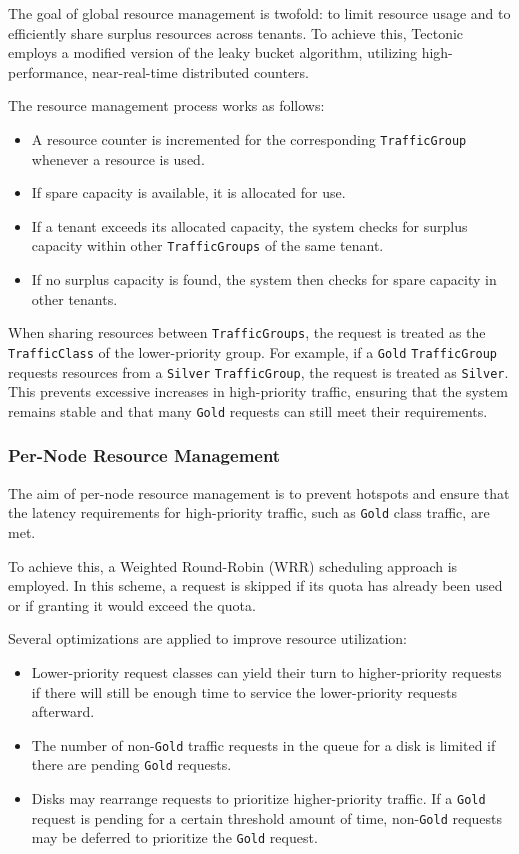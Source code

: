 The goal of global resource management is twofold: to limit resource usage and to efficiently share surplus resources across tenants. To achieve this, Tectonic employs a modified version of the leaky bucket algorithm, utilizing high-performance, near-real-time distributed counters.

The resource management process works as follows:

\begin{itemize}\label{list:resource_management}
    \item A resource counter is incremented for the corresponding \texttt{TrafficGroup} whenever a resource is used.
    \item If spare capacity is available, it is allocated for use.
    \item If a tenant exceeds its allocated capacity, the system checks for surplus capacity within other \texttt{TrafficGroups} of the same tenant.
    \item If no surplus capacity is found, the system then checks for spare capacity in other tenants.
\end{itemize}

When sharing resources between \texttt{TrafficGroups}, the request is treated as the \texttt{TrafficClass} of the lower-priority group. For example, if a \texttt{Gold} \texttt{TrafficGroup} requests resources from a \texttt{Silver} \texttt{TrafficGroup}, the request is treated as \texttt{Silver}. This prevents excessive increases in high-priority traffic, ensuring that the system remains stable and that many \texttt{Gold} requests can still meet their requirements.

\subsubsection{Per-Node Resource Management}\label{sec:per_node_resource_management}

The aim of per-node resource management is to prevent hotspots and ensure that the latency requirements for high-priority traffic, such as \texttt{Gold} class traffic, are met.

To achieve this, a Weighted Round-Robin (WRR) scheduling approach is employed. In this scheme, a request is skipped if its quota has already been used or if granting it would exceed the quota.

Several optimizations are applied to improve resource utilization:

\begin{itemize}
    \item Lower-priority request classes can yield their turn to higher-priority requests if there will still be enough time to service the lower-priority requests afterward.
    \item The number of non-\texttt{Gold} traffic requests in the queue for a disk is limited if there are pending \texttt{Gold} requests.
    \item Disks may rearrange requests to prioritize higher-priority traffic. If a \texttt{Gold} request is pending for a certain threshold amount of time, non-\texttt{Gold} requests may be deferred to prioritize the \texttt{Gold} request.
\end{itemize}


